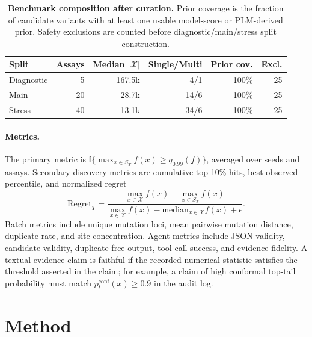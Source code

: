 \documentclass{article}
\newcommand{\topten}{top-10\%}
\newcommand{\xset}{\mathcal X}
\newcommand{\I}{\mathbb I}
\begin{document}
\begin{table}[t]
\caption{\textbf{Benchmark composition after curation.} Prior coverage is the fraction of candidate variants with at least one usable model-score or PLM-derived prior. Safety exclusions are counted before diagnostic/main/stress split construction.}
\label{tab:benchmark}
\centering
\scriptsize
\setlength{\tabcolsep}{2.8pt}
\begin{tabular}{lrrrrr}
\toprule
Split & Assays & Median $|\xset|$ & Single/Multi & Prior cov. & Excl. \\
\midrule
Diagnostic & 5 & 167.5k & 4/1 & 100\% & 25 \\
Main & 20 & 28.7k & 14/6 & 100\% & 25 \\
Stress & 40 & 13.1k & 34/6 & 100\% & 25 \\
\bottomrule
\end{tabular}
\end{table}

\paragraph{Metrics.} The primary metric is $\I\{\max_{x\in S_T}f(x)\ge q_{0.99}(f)\}$, averaged over seeds and assays. Secondary discovery metrics are cumulative \topten{} hits, best observed percentile, and normalized regret
\begin{equation}
\mathrm{Regret}_T=\frac{\max_{x\in\xset}f(x)-\max_{x\in S_T}f(x)}{\max_{x\in\xset}f(x)-\mathrm{median}_{x\in\xset}f(x)+\epsilon}.
\end{equation}
Batch metrics include unique mutation loci, mean pairwise mutation distance, duplicate rate, and site concentration. Agent metrics include JSON validity, candidate validity, duplicate-free output, tool-call success, and evidence fidelity. A textual evidence claim is faithful if the recorded numerical statistic satisfies the threshold asserted in the claim; for example, a claim of high conformal top-tail probability must match $p_t^{\mathrm{conf}}(x)\ge 0.9$ in the audit log.

\section{Method}
\label{sec:method}
\end{document}
